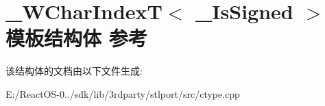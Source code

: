 \hypertarget{struct___w_char_index_t}{}\section{\+\_\+\+W\+Char\+IndexT$<$ \+\_\+\+Is\+Signed $>$ 模板结构体 参考}
\label{struct___w_char_index_t}


该结构体的文档由以下文件生成\+:\begin{DoxyCompactItemize}
\item 
E\+:/\+React\+O\+S-\/0../sdk/lib/3rdparty/stlport/src/ctype.\+cpp\end{DoxyCompactItemize}
